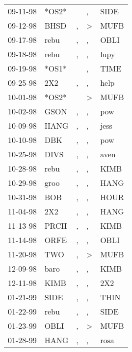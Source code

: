\begin{supertabular}{lllll}
 09-11-98 &  *OS2* &                  &             , &   SIDE \\
 09-12-98 &   BHSD &                , &  \textgreater &   MUFB \\
 09-17-98 &   rebu &                , &             , &   OBLI \\
 09-18-98 &   rebu &                , &             , &   lupy \\
 09-19-98 &  *OS1* &                  &             , &   TIME \\
 09-25-98 &    2X2 &                , &             , &   help \\
 10-01-98 &  *OS2* &                  &  \textgreater &   MUFB \\
 10-02-98 &   GSON &                , &             , &    pow \\
 10-09-98 &   HANG &                , &             , &   jess \\
 10-10-98 &    DBK &                , &             , &    pow \\
 10-25-98 &   DIVS &                , &             , &   aven \\
 10-28-98 &   rebu &                , &             , &   KIMB \\
 10-29-98 &   groo &                , &             , &   HANG \\
 10-31-98 &    BOB &                , &             , &   HOUR \\
 11-04-98 &    2X2 &                , &             , &   HANG \\
 11-13-98 &   PRCH &                , &             , &   KIMB \\
 11-14-98 &   ORFE &                , &             , &   OBLI \\
 11-20-98 &    TWO &                , &  \textgreater &   MUFB \\
 12-09-98 &   baro &                , &             , &   KIMB \\
 12-11-98 &   KIMB &                , &             , &    2X2 \\
 01-21-99 &   SIDE &                , &             , &   THIN \\
 01-22-99 &   rebu &                , &             , &   SIDE \\
 01-23-99 &   OBLI &                , &  \textgreater &   MUFB \\
 01-28-99 &   HANG &                , &             , &   rosa \\

\end{supertabular}
